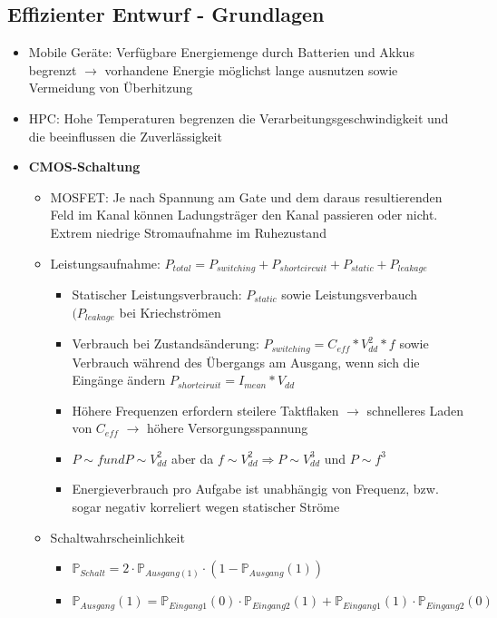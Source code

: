 \subsection{Effizienter Entwurf - Grundlagen}
\begin{itemize}
	\item Mobile Geräte: Verfügbare Energiemenge durch Batterien und Akkus begrenzt \(\rightarrow\) vorhandene Energie möglichst lange ausnutzen sowie Vermeidung von Überhitzung
	\item HPC: Hohe Temperaturen begrenzen die Verarbeitungsgeschwindigkeit und die beeinflussen die Zuverlässigkeit
	\item \textbf{CMOS-Schaltung}
	\begin{itemize}
		\item MOSFET: Je nach Spannung am Gate und dem daraus resultierenden Feld im Kanal können Ladungsträger den Kanal passieren oder nicht. Extrem niedrige Stromaufnahme im Ruhezustand
		\item Leistungsaufnahme: \(P_{total} = P_{switching} + P_{shortcircuit} + P_{static} + P_{leakage}\)
		\begin{itemize}
			\item Statischer Leistungsverbrauch: \(P_{static}\) sowie Leistungsverbauch $(P_{leakage}$ bei Kriechströmen
			\item Verbrauch bei Zustandsänderung: \(P_{switching}=C_{eff}*V_{dd}^2*f\) sowie Verbrauch während des Übergangs am Ausgang, wenn sich die Eingänge ändern \(P_{shortciruit}=I_{mean}*V_{dd}\) 
			\item Höhere Frequenzen erfordern steilere Taktflaken \(\rightarrow\) schnelleres Laden von \(C_{eff}\) \(\rightarrow\) höhere Versorgungsspannung 
			\item \(P \sim f und P \sim V_{dd}^2\) aber da $f \sim V_{dd}^2 \Rightarrow P \sim V_{dd}^3 $ und $P \sim f^3$
			\item Energieverbrauch pro Aufgabe ist unabhängig von Frequenz, bzw. sogar negativ korreliert wegen statischer Ströme		
		\end{itemize}
		\item Schaltwahrscheinlichkeit

		\begin{itemize}
			\item \(\mathbb{P}_{Schalt} = 2 \cdot \mathbb{P}_{Ausgang(1)} \cdot (1-\mathbb{P}_{Ausgang}(1))\)
			\item \(\mathbb{P}_{Ausgang}(1) = \mathbb{P}_{Eingang1}(0) \cdot \mathbb{P}_{Eingang2}(1) + \mathbb{P}_{Eingang1}(1) \cdot \mathbb{P}_{Eingang2}(0)\)
		\end{itemize}
	\end{itemize}
\end{itemize}

